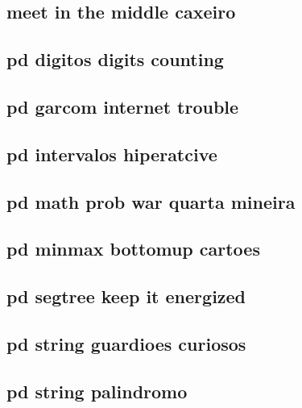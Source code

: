 \subsection{meet in the middle caxeiro}
\raggedbottom
\hrulefill
\subsection{pd digitos digits counting}
\raggedbottom
\hrulefill
\subsection{pd garcom internet trouble}
\raggedbottom
\hrulefill
\subsection{pd intervalos hiperatcive}
\raggedbottom
\hrulefill
\subsection{pd math prob war quarta mineira}
\raggedbottom
\hrulefill
\subsection{pd minmax bottomup cartoes}
\raggedbottom
\hrulefill
\subsection{pd segtree keep it energized}
\raggedbottom
\hrulefill
\subsection{pd string guardioes curiosos}
\raggedbottom
\hrulefill
\subsection{pd string palindromo}
\raggedbottom
\hrulefill
